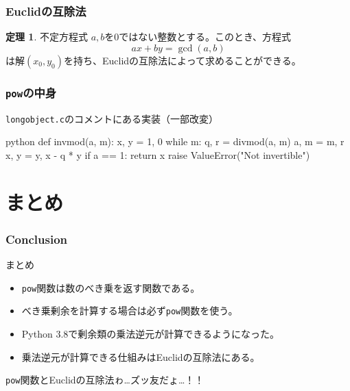 \documentclass[aspectratio=169,dvipdfmx,14pt,notheorems]{beamer}
\theoremstyle{definition}
\newtheorem{theorem}{定理}
\begin{document}
\begin{frame}[fragile]\frametitle{Euclidの互除法}
\begin{theorem}{不定方程式}
$a, b$を0ではない整数とする。このとき、方程式
\begin{equation*}
ax + by = \gcd(a, b)
\end{equation*}
は解$(x_{0}, y_{0})$を持ち、Euclidの互除法によって求めることができる。
\end{theorem}
\end{frame}

\begin{frame}[fragile]\frametitle{\texttt{pow}の中身}
\begin{block}{\texttt{longobject.c}のコメントにある実装（一部改変）}
\begin{pygments}{python}
def invmod(a, m):
    x, y = 1, 0
    while m:
        q, r = divmod(a, m)
        a, m = m, r
        x, y = y, x - q * y
    if a == 1:
        return x
    raise ValueError("Not invertible")
\end{pygments}
\end{block}
\end{frame}


\section{まとめ}

\begin{frame}[fragile]\frametitle{Conclusion}
\begin{block}{まとめ}
\begin{itemize}
\item \texttt{pow}関数は数のべき乗を返す関数である。
\item べき乗剰余を計算する場合は必ず\texttt{pow}関数を使う。
\item Python 3.8で剰余類の乗法逆元が計算できるようになった。
\item 乗法逆元が計算できる仕組みはEuclidの互除法にある。
\end{itemize}
\end{block}
\texttt{pow}関数とEuclidの互除法ゎ…ズッ友だょ…！！
\end{frame}
\end{document}
